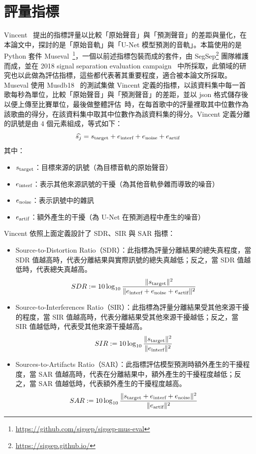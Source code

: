 \section{評量指標}
Vincent~\cite{vincent2006performance} 提出的指標評量以比較「原始聲音」與「預測聲音」的差距與量化，在本論文中，探討的是「原始音軌」與「U-Net 模型預測的音軌」。本篇使用的是 Python 套件 Museval~\cite{stoter2018museval}\footnote{\url{https://github.com/sigsep/sigsep-mus-eval}}，一個以前述指標包裝而成的套件，由 SegSep\footnote{\url{https://sigsep.github.io/}} 團隊維護而成，並在 2018 signal separation evaluation campaign~\cite{stoter20182018} 中所採取，此領域的研究也以此做為評估指標，這些都代表著其重要程度，適合被本論文所採取。Museval 使用 Musdb18~\cite{rafii2017musdb18,musdb18} 的測試集做 Vincent 定義的指標，以該資料集中每一首歌每秒為單位，比較「原始聲音」與「預測聲音」的差距，並以 json 格式儲存後以便上傳至比賽單位，最後做整體評估~\cite{stoter20182018}時，在每首歌中的評量裡取其中位數作為該歌曲的得分，在該資料集中取其中位數作為該資料集的得分。Vincent 定義分離的訊號是由 4 個元素組成，等式如下：
\begin{equation*}
    \widehat{s_j}=s_\textup{target}+e_\textup{interf}+e_\textup{noise}+e_\textup{artif}
\end{equation*}
其中：
\begin{itemize}
    \item $s_\textup{target}$：目標來源的訊號（為目標音軌的原始聲音）
    \item $e_\textup{interf}$：表示其他來源訊號的干擾（為其他音軌參雜而導致的噪音）
    \item $e_\textup{noise}$：表示訊號中的雜訊
    \item $e_\textup{artif}$：額外產生的干擾（為 U-Net 在預測過程中產生的噪音）
\end{itemize}
Vincent 依照上面定義設計了 SDR、SIR 與 SAR 指標：
\begin{itemize}
    \item Source-to-Distortion Ratio（SDR）：此指標為評量分離結果的總失真程度，當 SDR 值越高時，代表分離結果與實際訊號的總失真越低；反之，當 SDR 值越低時，代表總失真越高。
        \begin{equation*}
        SDR:=10\log_{10}\frac{\|s_\textup{target}\|^2}{\|e_\textup{interf}+e_\textup{noise}+e_\textup{artif}\|^2}
        \end{equation*}
    \item Source-to-Interferences Ratio（SIR）：此指標為評量分離結果受其他來源干擾的程度，當 SIR 值越高時，代表分離結果受其他來源干擾越低；反之，當 SIR 值越低時，代表受其他來源干擾越高。
        \begin{equation*}
        SIR:=10\log_{10}\frac{\|s_\textup{target}\|^2}{\|e_\textup{interf}\|^2}
        \end{equation*}
    \item Sources-to-Artifacts Ratio（SAR）：此指標評估模型預測時額外產生的干擾程度，當 SAR 值越高時，代表在分離結果中，額外產生的干擾程度越低；反之，當 SAR 值越低時，代表額外產生的干擾程度越高。
        \begin{equation*}
        SAR:=10\log_{10}\frac{\|s_\textup{target}+e_\textup{interf}+e_\textup{noise}\|^2}{\|e_\textup{artif}\|^2}
        \end{equation*}
\end{itemize}
